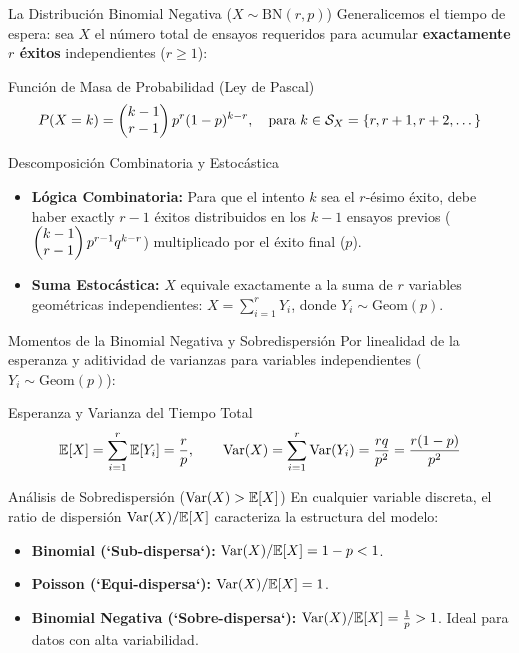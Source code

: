 \documentclass[10pt, aspectratio=169]{beamer}
\begin{document}
\begin{frame}{La Distribución Binomial Negativa ($X \sim \text{BN}(r, p)$)}
  \footnotesize
  Generalicemos el tiempo de espera: sea $X$ el número total de ensayos requeridos para acumular \textbf{exactamente $r$ éxitos} independientes ($r \ge 1$): \pause

  \vspace{0.1cm}
  \begin{block}{Función de Masa de Probabilidad (Ley de Pascal)}
    $$P(X = k) = \begin{pmatrix} k-1 \\ r-1 \end{pmatrix} p^r (1-p)^{k-r}, \quad \text{para } k \in \mathcal{S}_X = \{r, r+1, r+2, \dots\}$$
  \end{block}

  \vspace{0.1cm}
  \pause
  \begin{alertblock}{Descomposición Combinatoria y Estocástica}
    \begin{itemize}\itemsep=0.06cm
      \item \textbf{Lógica Combinatoria:} Para que el intento $k$ sea el $r$-ésimo éxito, debe haber exactly $r-1$ éxitos distribuidos en los $k-1$ ensayos previos ($\begin{pmatrix} k-1 \\ r-1 \end{pmatrix}p^{r-1}q^{k-r}$) multiplicado por el éxito final ($p$).
      \item \textbf{Suma Estocástica:} $X$ equivale exactamente a la suma de $r$ variables geométricas independientes: $X = \sum_{i=1}^r Y_i$, donde $Y_i \sim \text{Geom}(p)$.
    \end{itemize}
  \end{alertblock}
\end{frame}

\begin{frame}{Momentos de la Binomial Negativa y Sobredispersión}
  \footnotesize
  Por linealidad de la esperanza y aditividad de varianzas para variables independientes ($Y_i \sim \text{Geom}(p)$): \pause

  \vspace{0.1cm}
  \begin{block}{Esperanza y Varianza del Tiempo Total}
    $$\mathbb{E}[X] = \sum_{i=1}^r \mathbb{E}[Y_i] = \dfrac{r}{p}, \qquad \operatorname{Var}(X) = \sum_{i=1}^r \operatorname{Var}(Y_i) = \dfrac{rq}{p^2} = \dfrac{r(1-p)}{p^2}$$
  \end{block}

  \vspace{0.1cm}
  \pause
  \begin{alertblock}{Análisis de Sobredispersión ($\operatorname{Var}(X) > \mathbb{E}[X]$)}
    En cualquier variable discreta, el ratio de dispersión $\operatorname{Var}(X) / \mathbb{E}[X]$ caracteriza la estructura del modelo:
    \begin{itemize}\itemsep=0.04cm
      \item \textbf{Binomial (`Sub-dispersa`):} $\operatorname{Var}(X) / \mathbb{E}[X] = 1-p < 1$.
      \item \textbf{Poisson (`Equi-dispersa`):} $\operatorname{Var}(X) / \mathbb{E}[X] = 1$.
      \item \textbf{Binomial Negativa (`Sobre-dispersa`):} $\operatorname{Var}(X) / \mathbb{E}[X] = \frac{1}{p} > 1$. Ideal para datos con alta variabilidad.
    \end{itemize}
  \end{alertblock}
\end{frame}
\end{document}
